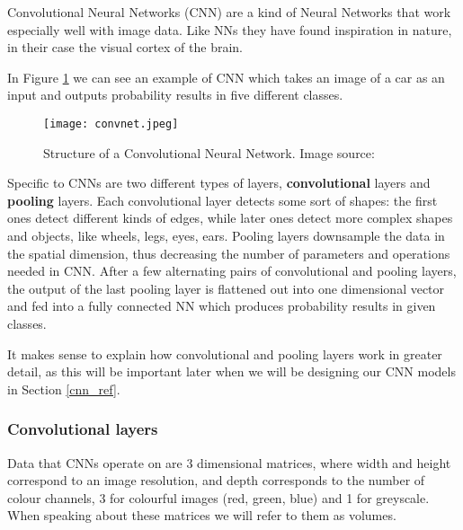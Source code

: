Convolutional Neural Networks (CNN) are a kind of Neural Networks that work especially well with image data.
Like NNs they have found inspiration in nature, in their case the visual cortex of the brain.\footnotemark
{}

In Figure \ref{convnet} we can see an example of CNN which takes an image of a car as an input and outputs probability results in five different classes.
\begin{figure}[ht]
        \centering
        \texttt{[image: convnet.jpeg]} 
        \caption[Structure of a Convolutional Neural Network.]{Structure of a Convolutional Neural Network. Image source:\cite{cs231n}}
        \label{convnet}
\end{figure}

Specific to CNNs are two different types of layers, \textbf{convolutional} layers and \textbf{pooling} layers.
Each convolutional layer detects some sort of shapes: the first ones detect different kinds of edges, while later ones detect more complex shapes and objects, like wheels, legs, eyes, ears.
Pooling layers downsample the data in the spatial dimension, thus decreasing the number of parameters and operations needed in CNN.
After a few alternating pairs of convolutional and pooling layers, the output of the last pooling layer is flattened out into one dimensional vector and fed into a fully connected NN which produces probability results in given classes.

It makes sense to explain how convolutional and pooling layers work in greater detail, as this will be important later when we will be designing our CNN models in Section \ref{cnn_ref}.


\subsubsection{ Convolutional layers}

Data that CNNs operate on are 3 dimensional matrices, where width and height correspond to an image resolution, and depth corresponds to the number of colour channels, 3 for colourful images (red, green, blue) and 1 for greyscale.
When speaking about these matrices we will refer to them as volumes.

